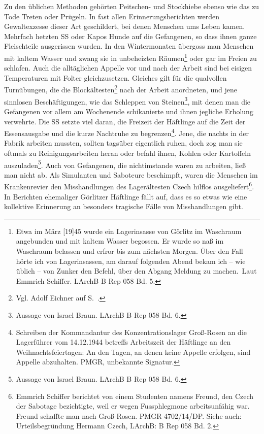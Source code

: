 \documentclass[a4paper,12pt,ngerman,
]{nisebook}
\begin{document}
Zu den üblichen Methoden gehörten Peitschen- und Stockhiebe ebenso wie das zu Tode Treten oder Prügeln. In fast allen Erinnerungsberichten werden Gewaltexzesse dieser Art geschildert, bei denen Menschen ums Leben kamen. Mehrfach hetzten SS oder Kapos Hunde auf die Gefangenen, so dass ihnen ganze Fleischteile ausgerissen wurden. In den Wintermonaten übergoss man Menschen mit kaltem Wasser und zwang sie in unbeheizten Räumen\footnote{\glqq Etwa im März [19]45 wurde ein Lagerinsasse von Görlitz im Waschraum angebunden und mit kaltem Wasser begossen. Er wurde so naß im Waschraum belassen und erfror bis zum nächsten Morgen. Über den Fall hörte ich von Lagerinsassen, am darauf folgenden Abend bekam ich -- wie üblich -- von Zunker den Befehl, über den Abgang Meldung zu machen.\grqq~Laut Emmrich Schiffer. LArchB B Rep 058 Bd. 5.} oder gar im Freien zu schlafen. Auch die alltäglichen Appelle vor und nach der Arbeit sind bei eisigen Temperaturen mit Folter gleichzusetzen. Gleiches gilt für die qualvollen \glqq Turnübungen\grqq, die die Blockältesten\footnote{Vgl. Adolf Eichner auf S.~\pageref{turnen}.} nach der Arbeit anordneten, und jene sinnlosen Beschäftigungen, wie das Schleppen von Steinen\footnote{Aussage von Israel Braun. LArchB B Rep 058 Bd. 6.}, mit denen man die Gefangenen vor allem am Wochenende schikanierte und ihnen jegliche Erholung verwehrte. Die SS setzte viel daran, die Freizeit der Häftlinge auf die Zeit der Essensausgabe und die kurze Nachtruhe zu begrenzen\footnote{Schreiben der Kommandantur des Konzentrationslager Groß-Rosen an die Lagerführer vom 14.12.1944 betreffs Arbeitszeit der Häftlinge an den Weihnachtsfeiertagen: An den Tagen, an denen keine Appelle erfolgen, sind Appelle abzuhalten. PMGR, unbekannte Signatur.}. Jene, die nachts in der Fabrik arbeiten mussten, sollten tagsüber eigentlich ruhen, doch zog man sie oftmals zu Reinigungsarbeiten heran oder befahl ihnen, Kohlen oder Kartoffeln auszuladen\footnote{Aussage von Israel Braun. LArchB B Rep 058 Bd. 6.}. Auch von Gefangenen, die nicht\pagebreak\newpage imstande waren zu arbeiten, ließ man nicht ab. Als Simulanten und Saboteure beschimpft, waren die Menschen im Krankenrevier den Misshandlungen des Lagerältesten Czech hilflos ausgeliefert\footnote{Emmrich Schiffer berichtet von einem Studenten namens Freund, den Czech der Sabotage bezichtigte, weil er wegen Fussphlegmone arbeitsunfähig war. Freund schaffte man nach Groß-Rosen. PMGR 4702/14/DP. Siehe auch: Urteilsbegründung Hermann Czech, LArchB: B Rep 058 Bd. 2.}.
\newline
In Berichten ehemaliger Görlitzer Häftlinge fällt auf, dass es so etwas wie eine kollektive Erinnerung an besonders tragische Fälle von Misshandlungen gibt.
\end{document}
